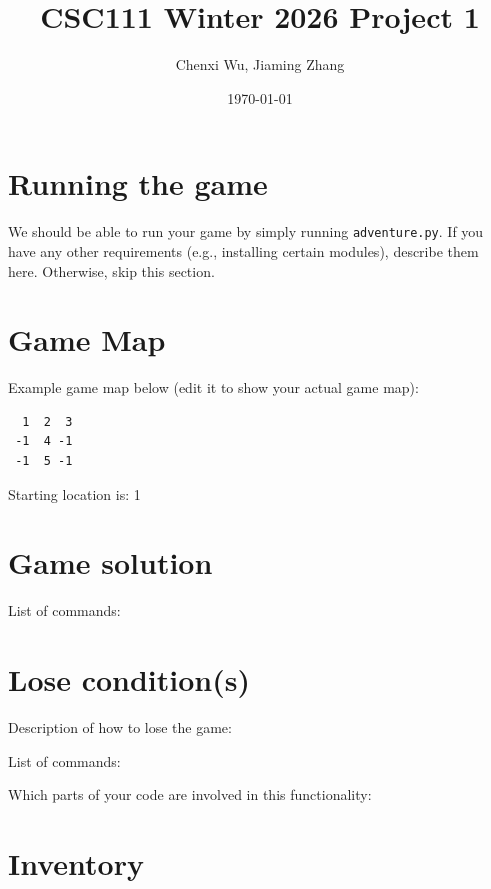 \documentclass[11pt]{article}
\title{CSC111 Winter 2026 Project 1}
\author{Chenxi Wu, Jiaming Zhang}
\date{\today}
\begin{document}
\maketitle

\section*{Running the game}
We should be able to run your game by simply running \texttt{adventure.py}. If you have any other requirements (e.g., installing certain modules), describe them here. Otherwise, skip this section.

\section*{Game Map}
Example game map below (edit it to show your actual game map):

\begin{verbatim}
  1  2  3
 -1  4 -1
 -1  5 -1
\end{verbatim}

Starting location is: 1

\section*{Game solution}
List of commands:

\section*{Lose condition(s)}
Description of how to lose the game:

List of commands:

Which parts of your code are involved in this functionality:


\section*{Inventory}
\end{document}
